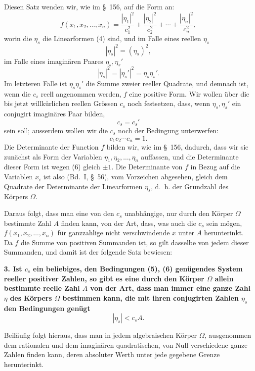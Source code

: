 \documentclass[11pt]{article}
\begin{document}
Diesen Satz wenden wir, wie im \S~156, auf die Form an:
\[
f(x_1,x_2,\ldots,x_n)=\frac{|\eta_1|^2}{c_1^2}+\frac{|\eta_2|^2}{c_2^2}+\cdots+\frac{|\eta_n|^2}{c_n^2},
\]
worin die $\eta_s$ die Linearformen (4) sind, und im Falle eines reellen $\eta_s$
\[
|\eta_s|^2=(\eta_s)^2,
\]
im Falle eines imaginären Paares $\eta_s,\eta_s'$
\[
|\eta_s|^2=|\eta_s'|^2=\eta_s\eta_s'.
\]
Im letzteren Falle ist $\eta_s\eta_s'$ die Summe zweier reeller Quadrate, und demnach ist, wenn die $c_s$ reell angenommen werden, $f$ eine positive Form. Wir wollen über die bis jetzt willkürlichen reellen Grössen $c_s$ noch festsetzen, dass, wenn $\eta_s,\eta_s'$ ein conjugirt imaginäres Paar bilden,
\begin{equation}
c_s=c_s'
\tag{5}
\end{equation}
sein soll; ausserdem wollen wir die $c_s$ noch der Bedingung unterwerfen:
\begin{equation}
c_1c_2\cdots c_n=1.
\tag{6}
\end{equation}
Die Determinante der Function $f$ bilden wir, wie im \S~156, dadurch, dass wir sie zunächst als Form der Variablen $\eta_1,\eta_2,\ldots,\eta_n$ auffassen, und die Determinante dieser Form ist wegen (6) gleich $\pm1$. Die Determinante von $f$ in Bezug auf die Variablen $x_i$ ist also (Bd.~I, \S~56), vom Vorzeichen abgesehen, gleich dem
Quadrate der Determinante der Linearformen $\eta_s$, d.~h. der Grundzahl des Körpers $\Omega$.

Daraus folgt, dass man eine von den $c_s$ unabhängige, nur durch den Körper $\Omega$ bestimmte Zahl $A$ finden kann, von der Art, dass, was auch die $c_s$ sein mögen, $f(x_1,x_2,\ldots,x_n)$ für ganzzahlige nicht verschwindende $x$ unter $A$ herunterinkt. Da $f$ die Summe von positiven Summanden ist, so gilt dasselbe von jedem dieser Summanden, und damit ist der folgende Satz bewiesen:

\textbf{3. Ist $c_s$ ein beliebiges, den Bedingungen (5), (6) genügendes System reeller positiver Zahlen, so gibt es eine durch den Körper $\Omega$ allein bestimmte reelle Zahl $A$ von der Art, dass man immer eine ganze Zahl $\eta$ des Körpers $\Omega$ bestimmen kann, die mit ihren conjugirten Zahlen $\eta_s$ den Bedingungen genügt}
\begin{equation}
|\eta_s|<c_sA.
\tag{7}
\end{equation}

Beiläufig folgt hieraus, dass man in jedem algebraischen Körper $\Omega$, ausgenommen dem rationalen und dem imaginären quadratischen, von Null verschiedene ganze Zahlen finden kann, deren absoluter Werth unter jede gegebene Grenze herunterinkt.
\end{document}
